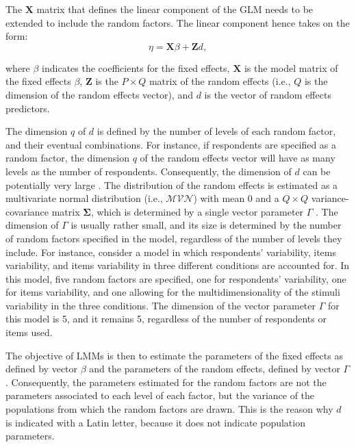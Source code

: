 \documentclass[12pt]{book}
\begin{document}
The $\bm{X}$ matrix that defines the linear component of the GLM needs to be extended to include the random factors. 
The linear component hence takes on the form:
\begin{equation}
	\eta = \bm{X}\beta + \bm{Z}d,
\end{equation}

where $\beta$ indicates the coefficients for the fixed effects, $\bm{X}$ is the model matrix of the fixed effects $\beta$, $\bm{Z}$ is the $P \times Q$ matrix of the random effects (i.e., $Q$ is the dimension of the random effects vector), and $d$ is the vector of random effects predictors. 

The dimension $q$ of $d$ is defined by the number of levels of each random factor, and their eventual combinations. For instance, if respondents are specified as a random factor, the dimension $q$ of the random effects vector will have as many levels as the number of respondents. 
Consequently, the dimension of $d$ can be potentially very large \cite{Doran2007}.
The distribution of the random effects is estimated as a multivariate normal distribution (i.e., $\mathcal{MVN}$) with mean 0 and a $Q \times Q$ variance-covariance matrix $\bm{\Sigma}$, which is determined by a single vector parameter $\Gamma$ \cite{Doran2007}. 
The dimension of $\Gamma$ is usually rather small, and its size is determined by the number of random factors specified in the model, regardless of the number of levels they include.  
For instance, consider a model in which respondents' variability, items variability, and items variability in three different conditions are accounted for. In this model, five random factors are specified, one for respondents' variability, one for items variability, and one allowing for the multidimensionality of the stimuli variability in the three conditions. 
	The dimension of the vector parameter $\Gamma$ for this model is 5, and it remains 5, regardless of the number of respondents or items used.

The objective of LMMs is then to estimate the parameters of the fixed effects as defined by vector $\beta$ and the parameters of the random effects, defined by vector $\Gamma$. Consequently, the parameters estimated for the random factors are not the parameters associated to each level of each factor, but the variance of the populations from which the random factors are drawn. This is the reason why $d$ is indicated with a Latin letter, because it does not indicate population parameters.
 
\end{document}

